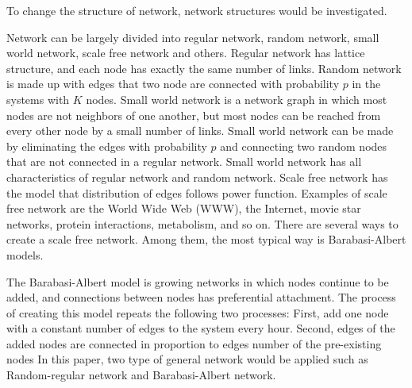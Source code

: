 To change the structure of network, network structures would be investigated.   

Network can be largely divided into regular network, random network\cite{erdos1960}, small world network\cite{watts1998}, scale free network\cite{barabasi1999} and others. 
Regular network has lattice structure, and  each node has exactly the same number of links.
Random network is made up with edges that two node are connected with probability $p$ in the systems with $K$ nodes. 
Small world network is a network graph in which most nodes are not neighbors of one another, but most nodes can be reached from every other node by a small number of links. Small world network can be made by eliminating the edges with probability $p$ and connecting two random nodes that are not connected in a regular network. Small world network has all characteristics of regular network and random network.
Scale free network has the model that distribution of edges follows power function. Examples of scale free network are the World Wide Web (WWW), the Internet, movie star networks, protein interactions, metabolism, and so on.
There are several ways to create a scale free network. Among them,  the most typical way is Barabasi-Albert models.


The Barabasi-Albert model is growing networks in which nodes continue to be added, and connections between nodes has preferential attachment. The process of creating this model repeats the following two processes: First, add one node with a constant number of edges to the system every hour. Second, edges of the added nodes are connected in proportion to edges number of the pre-existing nodes
In this paper, two type of general network would be applied such as Random-regular network and Barabasi-Albert network.


